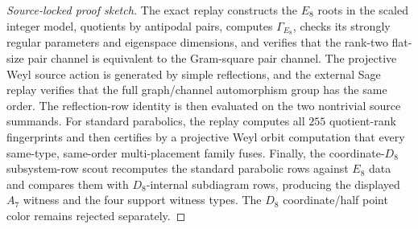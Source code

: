 \begin{proof}[Source-locked proof sketch]
The exact replay constructs the \(E_8\) roots in the scaled integer model, quotients by antipodal pairs, computes \(\Gamma_{E_8}\), checks its strongly regular parameters and eigenspace dimensions, and verifies that the rank-two flat-size pair channel is equivalent to the Gram-square pair channel.  The projective Weyl source action is generated by simple reflections, and the external Sage replay verifies that the full graph/channel automorphism group has the same order.  The reflection-row identity is then evaluated on the two nontrivial source summands.  For standard parabolics, the replay computes all \(255\) quotient-rank fingerprints and then certifies by a projective Weyl orbit computation that every same-type, same-order multi-placement family fuses.  Finally, the coordinate-\(D_8\) subsystem-row scout recomputes the standard parabolic rows against \(E_8\) data and compares them with \(D_8\)-internal subdiagram rows, producing the displayed \(A_7\) witness and the four support witness types.  The \(D_8\) coordinate/half point color remains rejected separately.
\end{proof}

